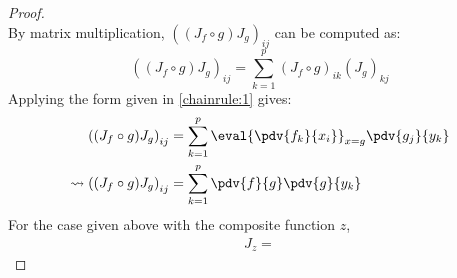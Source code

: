 \begin{lemma}
\begin{proof}
\begin{equation}
	\end{equation}
	By matrix multiplication, $((J_f\circ g)J_g)_{ij}$ can be computed as:
	$$
		\left((J_f\circ g)J_g\right)_{ij}=\sum_{k=1}^p(J_f\circ g)_{ik}(J_g)_{kj}
	$$
	Applying the form given in \ref{chainrule:1} gives:
	\begin{align}
		\notag\left((J_f\circ g)J_g\right)_{ij}&=\sum_{k=1}^p\eval{\pdv{f_k}{x_i}}_{x=g}\pdv{g_j}{y_k}\\
		\leadsto\left((J_f\circ g)J_g\right)_{ij}&=\sum_{k=1}^p\pdv{f}{g}\pdv{g}{y_k}\qedhere
	\end{align}
	For the case given above with the composite function $z$,
	\begin{align*}
		J_z=
	\end{align*}
\end{proof}
\end{lemma}

